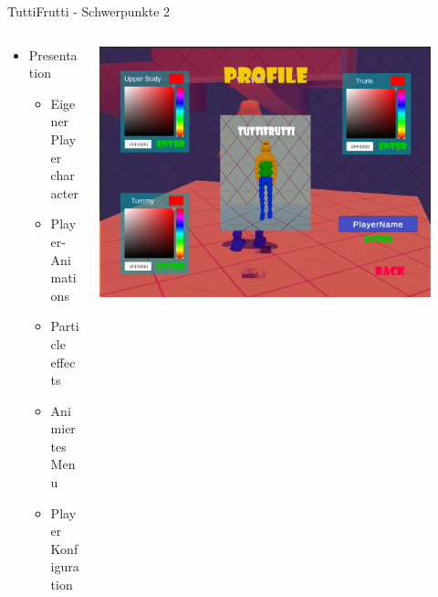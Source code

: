 \documentclass[xcolor=dvipsnames]{beamer}
\begin{document}
\begin{frame}{TuttiFrutti - Schwerpunkte 2}
\begin{columns}
\begin{column}{0.5\textwidth}
\begin{itemize}
	\item Presentation
	\begin{itemize}
		\item Eigener Player character 
		\item Player-Animations
		\item Particle effects
		\item Animiertes Menu 
		\item Player Konfiguration
	\end{itemize}
\end{itemize}
\end{column}
\begin{column}{0.5\textwidth} 
\begin{center}
		\includegraphics[width=0.9\textwidth]{TuttiFrutti_Profile.png}
\end{center}
\end{column}
\end{columns}

\end{frame}
\end{document}
